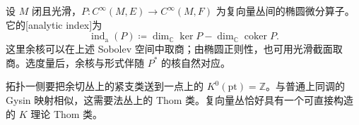 \begin{definition}\label{g2:def:analytic-index}
	设 \(M\) 闭且光滑，\(P:C^\infty(M,E)\to C^\infty(M,F)\) 为复向量丛间的椭圆微分算子。它的[analytic index]为
	\[
		\operatorname{ind}_{\mathrm a}(P)\coloneqq
		\dim_{\mathbb C}\ker P-\dim_{\mathbb C}\operatorname{coker}P.
	\]
	这里余核可以在上述 Sobolev 空间中取商；由椭圆正则性，也可用光滑截面取商。选度量后，余核与形式伴随 \(P^*\) 的核自然对应。
\end{definition}

拓扑一侧要把余切丛上的紧支类送到一点上的 \(K^0(\mathrm{pt})=\mathbb Z\)。与普通上同调的 Gysin 映射相似，这需要法丛上的 Thom 类。复向量丛恰好具有一个可直接构造的 \(K\) 理论 Thom 类。


